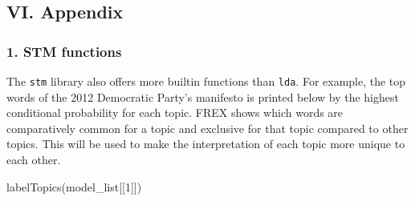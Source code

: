 \documentclass[
]{article}
\newenvironment{Shaded}{\begin{snugshade}}{\end{snugshade}}
\newcommand{\DecValTok}[1]{\textcolor[rgb]{0.00,0.00,0.81}{#1}}
\newcommand{\FunctionTok}[1]{\textcolor[rgb]{0.00,0.00,0.00}{#1}}
\newcommand{\NormalTok}[1]{#1}
\begin{document}
\hypertarget{vi.-appendix}{%
\subsection{VI. Appendix}\label{vi.-appendix}}

\hypertarget{stm-functions}{%
\subsubsection{1. STM functions}\label{stm-functions}}

The \texttt{stm} library also offers more builtin functions than
\texttt{lda}. For example, the top words of the 2012 Democratic Party's
manifesto is printed below by the highest conditional probability for
each topic. FREX shows which words are comparatively common for a topic
and exclusive for that topic compared to other topics. This will be used
to make the interpretation of each topic more unique to each other.

\begin{Shaded}
\begin{Highlighting}[]
\FunctionTok{labelTopics}\NormalTok{(model\_list[[}\DecValTok{1}\NormalTok{]])}
\end{Highlighting}
\end{Shaded}
\end{document}
